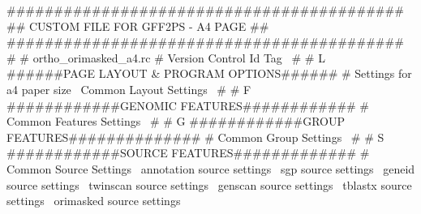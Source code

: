 \documentclass[11pt]{article}
\def\nwendcode{\endtrivlist \endgroup} %
\let\nwdocspar=\par                    %
\begin{document}
\nwenddocs{}\endmoddef
##########################################
##   CUSTOM FILE FOR GFF2PS - A4 PAGE   ##
##########################################
#
# ortho_orimasked_a4.rc
#
\LA{}Version Control Id Tag~{\nwtagstyle{}}\RA{}
#
# L ######PAGE LAYOUT & PROGRAM OPTIONS######
#
\LA{}Settings for a4 paper size~{\nwtagstyle{}}\RA{}
\LA{}Common Layout Settings~{\nwtagstyle{}}\RA{}
#
# F ############GENOMIC FEATURES############
#
\LA{}Common Features Settings~{\nwtagstyle{}}\RA{}
#
# G ############GROUP FEATURES##############
#
\LA{}Common Group Settings~{\nwtagstyle{}}\RA{}
#
# S ############SOURCE FEATURES#############
#
\LA{}Common Source Settings~{\nwtagstyle{}}\RA{}
\LA{}annotation source settings~{\nwtagstyle{}}\RA{}
\LA{}sgp source settings~{\nwtagstyle{}}\RA{}
\LA{}geneid source settings~{\nwtagstyle{}}\RA{}
\LA{}twinscan source settings~{\nwtagstyle{}}\RA{}
\LA{}genscan source settings~{\nwtagstyle{}}\RA{}
\LA{}tblastx source settings~{\nwtagstyle{}}\RA{}
\LA{}orimasked source settings~{\nwtagstyle{}}\RA{}
\nwendcode{}\nwdocspar
\end{document}
